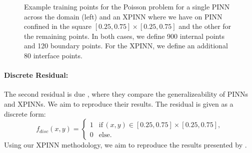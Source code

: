 \begin{figure}[t]
    \hfill
    \caption{Example training points for the Poisson problem for a single PINN across the domain (left) and an XPINN where we have on PINN confined in the square $[0.25, 0.75]\times [0.25, 0.75]$ and the other for the remaining points. In both cases, we define 900 internal points and 120 boundary points. For the XPINN, we define an additional 80 interface points.}
    \label{fig:decomp_poisson}
\end{figure}

\paragraph{Discrete Residual:}
The second residual is due \cite{XPINN_generalize}, where they compare the generalizeability of PINNs and XPINNs. We aim to reproduce their results. The residual is given as a discrete form:
\begin{equation*}
    f_{disc}(x,y)=
    \begin{cases}
        1 &\text{if} \, (x,y)\in [0.25,0.75]\times[0.25,0.75], \\
        0 &\text{else}.
        \label{eq:discrete_poisson}
    \end{cases}
\end{equation*}
Using our XPINN methodology, we aim to reproduce the results presented by \textcite{XPINN_generalize}.

